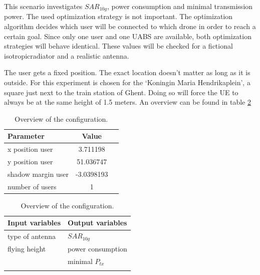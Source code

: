 This scenario investigates $SAR_{10g}$, power consumption and minimal transmission power. The used optimization strategy is not important.
The optimization algorithm decides which user will be connected to which drone in order to reach a certain goal. Since only one user and one
\gls{UABS} are available, both optimization strategies will behave identical. These values will be checked for a fictional \gls{isotropicradiator} and 
a realistic antenna.

The user gets a fixed position. The exact location doesn't matter as long as it is outside. For this experiment is chosen for the 
`Koningin Maria Hendrikaplein', a square just next to the train station of Ghent.  Doing so will force the \gls{UE} 
to always be at the same height of 1.5 meters. An overview can be found in table \ref{table:confOverviewScenario1}

\begin{table}[!htb]
    \begin{minipage}{.5\linewidth}
      \centering
        \begin{tabular}{|l|c|l|}
        \hline
        \textbf{Parameter}              & \textbf{Value}          \\   \hline 
        x position user               & 3.711198       \\    
        y position user               & 51.036747          \\ 
        shadow margin user             & -3.0398193 \\
        number of users                & 1 \\
        \hline
        \end{tabular}
    \end{minipage}%
    \begin{minipage}{.5\linewidth}
      \centering
            \begin{tabular}{|l|l|}
            \hline
            \textbf{Input variables  }              & \textbf{Output variables}          \\   \hline 
            type of antenna                & $SAR_{10g}$               \\ 
            flying height                  & power consumption             \\ 
                                           &  minimal $P_{tx}$ \\ 
                                           & \\
            \hline
            \end{tabular}
    \end{minipage} 
        \caption{Overview of the configuration.}
        \label{table:confOverviewScenario1}
\end{table}

